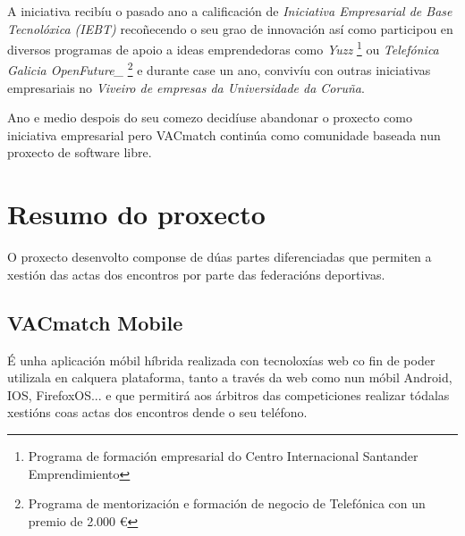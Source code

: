     A iniciativa recibíu o pasado ano a calificación de \emph{Iniciativa Empresarial de 
Base Tecnolóxica (IEBT)} recoñecendo o seu grao de innovación así como participou en 
diversos programas de apoio a ideas emprendedoras como \emph{Yuzz} 
\footnote{Programa de formación empresarial do Centro Internacional Santander 
Emprendimiento} ou \emph{Telefónica Galicia OpenFuture\_} \footnote{Programa de 
mentorización e formación de negocio de Telefónica con un premio de 2.000 
\euro{}} e durante case un ano, convivíu con 
outras iniciativas empresariais no \emph{Viveiro de empresas da Universidade da 
Coruña}.

    Ano e medio despois do seu comezo decidíuse abandonar o proxecto 
como iniciativa empresarial pero VACmatch continúa como comunidade baseada nun 
proxecto de software libre.

    \section{Resumo do proxecto}
    O proxecto desenvolto componse de dúas partes diferenciadas que permiten a 
xestión das actas dos encontros por parte das federacións deportivas.
    
    \subsection{VACmatch Mobile}
    É unha aplicación móbil híbrida realizada con tecnoloxías web co fin de 
poder utilizala en calquera plataforma, tanto a través da web como nun móbil 
Android, IOS, FirefoxOS... e que permitirá aos árbitros das competiciones 
realizar tódalas xestións coas actas dos encontros dende o seu teléfono.

